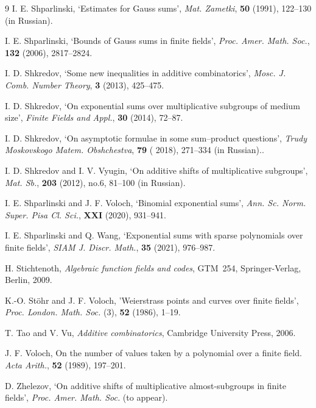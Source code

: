 \documentclass[12pt]{amsart}
\begin{document}
\begin{thebibliography}{9}
I. E. Shparlinski,  `Estimates for Gauss sums',
{\it Mat. Zametki\/},   {\bf 50} (1991),   122--130 (in Russian).

I. E. Shparlinski, `Bounds of Gauss sums in finite fields', 
 {\it  Proc. Amer. Math. Soc.\/}, {\bf 132}  (2006), 2817--2824. 
 
I. D. Shkredov, `Some new inequalities in additive combinatorics', 
{\it Mosc. J. Comb. Number Theory\/},  {\bf 3} (2013), 425--475.  

  I. D. Shkredov, 
`On exponential sums over multiplicative subgroups of medium
size', {\it Finite Fields and  Appl.\/}, {\bf 30} (2014),  72--87.

 I. D. Shkredov, `On asymptotic formulae in some sum--product questions',  
{\it Trudy Moskovskogo Matem. Obshchestva\/}, {\bf 79} ( 2018), 271--334 (in Russian)..


 
   I. D. Shkredov and I. V. Vyugin,
`On additive shifts of multiplicative subgroups',
{\it Mat. Sb.\/}, {\bf 203}  (2012), no.6, 81--100 (in Russian).

I. E. Shparlinski and J. F. Voloch,
`Binomial exponential sums', 
{\it Ann. Sc. Norm. Super. Pisa Cl. Sci.\/}, {\bf XXI} (2020), 931--941.
 
I. E. Shparlinski and Q. Wang, `Exponential sums with sparse polynomials over finite fields', 
 {\it  SIAM J. Discr. Math.\/},  {\bf 35} (2021), 976--987.
 

 H. Stichtenoth, {\it Algebraic function fields and codes\/}, GTM~254, Springer-Verlag, Berlin, 2009.
 
 K.-O. St\"ohr and J. F. Voloch, 
'Weierstrass points and curves over finite fields', {\it Proc. London. Math. Soc.\/} (3), {\bf 52} (1986), 1--19.

 T. Tao and V. Vu, 
{\it Additive combinatorics\/}, Cambridge University Press, 2006.

J. F. Voloch,
On the number of values taken by a polynomial over a finite field. 
{\it Acta Arith.\/}, {\bf 52} (1989), 197--201. 

 D. Zhelezov, `On additive shifts of multiplicative almost-subgroups in finite
fields',  {\it  Proc. Amer. Math. Soc.\/} (to appear). 

\end{thebibliography}
\end{document}
